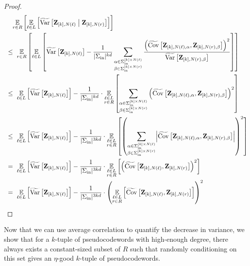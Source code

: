 \begin{proof}
	\begin{align*}
		&~~~\Ex{\ri\in R}{\Ex{\li\in L}{\tildeVar{\zee_{[k],N(\li)} \given \zee_{[k],N(\ri)}}}} \\
		~&\leq~ \Ex{\ri\in R}{\Ex{\li\in L}{\tildeVar{\zee_{[k],N(\li)}} - \frac{1}{|\Sigma_{\inn}|^{kd}} \sum_{\substack{\alpha \in \Sigma_{\inn}^{[k]\times N(\li)} \\ \beta \in \Sigma_{\inn}^{[k]\times N(\ri)}}} \frac{ \inparen{ \tildeCov{\zee_{[k],N(\li),\alpha}}{\zee_{[k],N(\ri),\beta}}}^2}{\tildeVar{\zee_{[k],N(\ri),\beta} }}}} \\
		~&\leq~ \Ex{\li\in L}{\tildeVar{\zee_{[k],N(\li)}}} - \frac{1}{|\Sigma_{\inn}|^{kd}} \cdot \Ex{\substack{\li\in L \\ \ri\in R}}{ \sum_{\substack{\alpha \in \Sigma_{\inn}^{[k]\times N(\li)} \\ \beta \in \Sigma_{\inn}^{[k]\times N(\ri)}}} \inparen{ \tildeCov{\zee_{[k],N(\li),\alpha}}{\zee_{[k],N(\ri),\beta}}}^2} \\
		~&\leq~ \Ex{\li\in L}{\tildeVar{\zee_{[k],N(\li)}}} - \frac{1}{|\Sigma_{\inn}|^{3kd}} \cdot \Ex{\substack{\li\in L \\ \ri\in R}}{ \inparen{ \sum_{\substack{\alpha \in \Sigma_{\inn}^{[k]\times N(\li)} \\ \beta \in \Sigma_{\inn}^{[k]\times N(\ri)}}}  \abs*{\tildeCov{\zee_{[k],N(\li),\alpha}}{\zee_{[k],N(\ri),\beta}}}}^2} \\
		~&=~ \Ex{\li\in L}{\tildeVar{\zee_{[k],N(\li)}}} - \frac{1}{|\Sigma_{\inn}|^{3kd}} \cdot \Ex{\substack{\li\in L \\ \ri\in R}}{ \inparen{ \tildeCov{\zee_{[k],N(\li)}}{\zee_{[k],N(\ri)}}}^2} \\
		~&=~ \Ex{\li\in L}{\tildeVar{\zee_{[k],N(\li)}}} - \frac{1}{|\Sigma_{\inn}|^{3kd}} \cdot \inparen{\Ex{\substack{\li\in L \\ \ri\in R}}{  \tildeCov{\zee_{[k],N(\li)}}{\zee_{[k],N(\ri)}}}}^2
	\end{align*}
\end{proof}

Now that we can use average correlation to quantify the decrease in variance, we show that for a $k$-tuple of pseudocodewords with high-enough degree, there always exists a constant-sized subset of $R$ such that randomly conditioning on this set gives an $\eta$-good $k$-tuple of pseudocodewords. 

